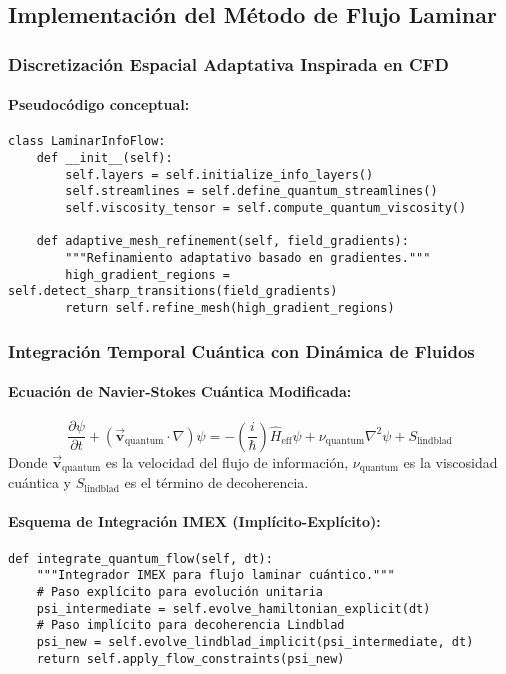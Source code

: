\documentclass{book}
\newcommand{\bvec}[1]{\vec{\mathbf{#1}}} %
\begin{document}
\subsection{Implementación del Método de Flujo Laminar}
\subsubsection{Discretización Espacial Adaptativa Inspirada en CFD}
\paragraph{Pseudocódigo conceptual:}
\begin{verbatim}
class LaminarInfoFlow:
    def __init__(self):
        self.layers = self.initialize_info_layers()
        self.streamlines = self.define_quantum_streamlines()
        self.viscosity_tensor = self.compute_quantum_viscosity()

    def adaptive_mesh_refinement(self, field_gradients):
        """Refinamiento adaptativo basado en gradientes."""
        high_gradient_regions = self.detect_sharp_transitions(field_gradients)
        return self.refine_mesh(high_gradient_regions)
\end{verbatim}

\subsubsection{Integración Temporal Cuántica con Dinámica de Fluidos}
\paragraph{Ecuación de Navier-Stokes Cuántica Modificada:}
\begin{equation}
    \frac{\partial\psi}{\partial t} + (\bvec{v}_{\text{quantum}} \cdot \nabla)\psi = 
    -\left(\frac{i}{\hbar}\right)\hat{H}_{\text{eff}} \psi + \nu_{\text{quantum}} \nabla^2\psi + S_{\text{lindblad}}
\end{equation}
Donde $\bvec{v}_{\text{quantum}}$ es la velocidad del flujo de información, $\nu_{\text{quantum}}$ es la viscosidad cuántica y $S_{\text{lindblad}}$ es el término de decoherencia.

\paragraph{Esquema de Integración IMEX (Implícito-Explícito):}
\begin{verbatim}
def integrate_quantum_flow(self, dt):
    """Integrador IMEX para flujo laminar cuántico."""
    # Paso explícito para evolución unitaria
    psi_intermediate = self.evolve_hamiltonian_explicit(dt)
    # Paso implícito para decoherencia Lindblad
    psi_new = self.evolve_lindblad_implicit(psi_intermediate, dt)
    return self.apply_flow_constraints(psi_new)
\end{verbatim}
\end{document}

